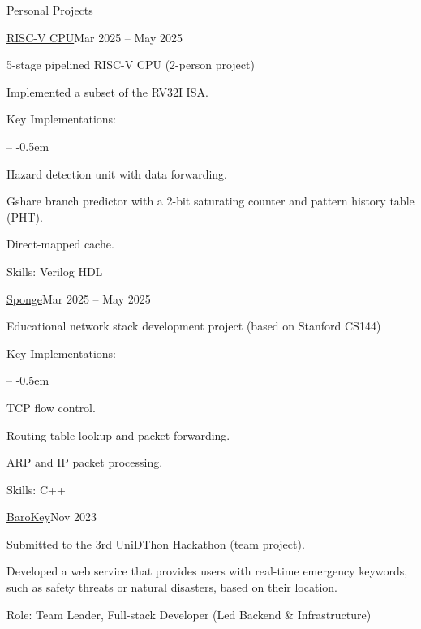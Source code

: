 \documentclass{resume}
\begin{document}
\begin{rSection}{Personal Projects}
	\begin{rSubsection}{\href{https://github.com/kimminss0/CSED311} {RISC-V CPU}}{Mar 2025 -- May 2025}

		5-stage pipelined RISC-V CPU (2-person project)

		\item Implemented a subset of the RV32I ISA.
		\item Key Implementations:
		\vspace{-0.5em}
		\begin{list}{--}{}
			\itemsep -0.5em

			\item Hazard detection unit with data forwarding.

			\item Gshare branch predictor with a 2-bit saturating counter and pattern history table (PHT).

			\item Direct-mapped cache.
		\end{list}
		\item Skills: Verilog HDL

	\end{rSubsection}

	\begin{rSubsection}{\href{https://github.com/kimminss0/CSED353} {Sponge}}{Mar 2025 -- May 2025}

		Educational network stack development project (based on Stanford CS144)

		\item Key Implementations:
		\vspace{-0.5em}
		\begin{list}{--}{}
			\itemsep -0.5em

			\item TCP flow control.

			\item Routing table lookup and packet forwarding.

			\item ARP and IP packet processing.
		\end{list}

		\item Skills: C++
	\end{rSubsection}

	\begin{rSubsection}{\href{https://github.com/UniD3-Hackathon-Team4/barokey} {BaroKey}}{Nov 2023}

		Submitted to the 3rd UniDThon Hackathon (team project).

		\item Developed a web service that provides users with real-time emergency keywords, such as safety threats or natural disasters, based on their location.

		\item Role: Team Leader, Full-stack Developer (Led Backend \& Infrastructure)
	\end{rSubsection}
\end{rSection}
\end{document}
